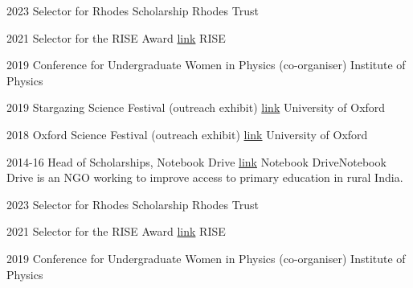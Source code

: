 \documentclass{scrartcl}
\begin{document}

\begin{entrylist}

\splitentry
{2023}
{Selector for Rhodes Scholarship}
{Rhodes Trust}{}

\splitentry
{2021}
{Selector for the RISE Award \href{https://www.risefortheworld.org/}{link}}
{RISE}{}

\splitentry
{2019}
{Conference for Undergraduate Women in Physics (co-organiser)}
{Institute of Physics}{}

\splitentry
{2019}
{Stargazing Science Festival (outreach exhibit) \href{https://web.archive.org/web/20230402133900/https://www.physics.ox.ac.uk/news/stargazing-oxfordhome}{link}}
{University of Oxford}{}

\splitentry
{2018}
{Oxford Science Festival (outreach exhibit) \href{https://web.archive.org/web/20230208050049/https://scienceoxford.com/events/oxfordshire-science-festival/}{link}}
{University of Oxford}{}

\splitentry
{2014-16}
{Head of Scholarships, Notebook Drive \href{https://web.archive.org/web/20230126231829/https://iisc.ac.in/outreach/activities/notebook-drive/}{link}}
{Notebook Drive}{Notebook Drive is an NGO working to improve access to primary education in rural India.}

\end{entrylist}


\begin{entrylist}

\splitentry
{2023}
{Selector for Rhodes Scholarship}
{Rhodes Trust}{}

\splitentry
{2021}
{Selector for the RISE Award \href{https://www.risefortheworld.org/}{link}}
{RISE}{}

\splitentry
{2019}
{Conference for Undergraduate Women in Physics (co-organiser)}
{Institute of Physics}{}

\end{entrylist}




\vfill
\end{document}
